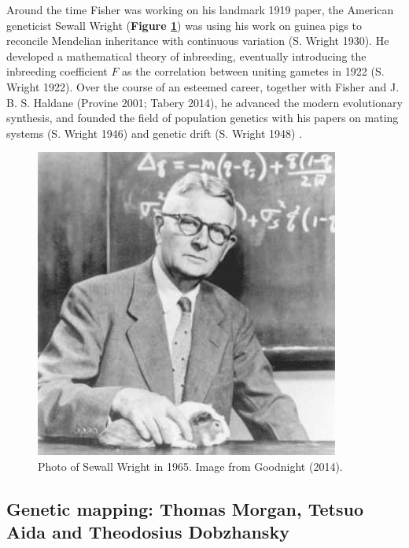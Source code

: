 \documentclass[
]{book}
\begin{document}
Around the time Fisher was working on his landmark 1919 paper, the American geneticist Sewall Wright (\textbf{Figure \ref{fig:wright}}) was using his work on guinea pigs to reconcile Mendelian inheritance with continuous variation (S. Wright 1930). He developed a mathematical theory of inbreeding, eventually introducing the inbreeding coefficient \(F\) as the correlation between uniting gametes in 1922 (S. Wright 1922). Over the course of an esteemed career, together with Fisher and J. B. S. Haldane (Provine 2001; Tabery 2014), he advanced the modern evolutionary synthesis, and founded the field of population genetics with his papers on mating systems (S. Wright 1946) and genetic drift (S. Wright 1948) .



\begin{figure}

\hfill{}\includegraphics[width=1\linewidth]{figs/introduction/Sewall_Wright} 

\caption{Photo of Sewall Wright in 1965. Image from Goodnight (2014).}\label{fig:wright}
\end{figure}

\hypertarget{genetic-mapping-thomas-morgan-tetsuo-aida-and-theodosius-dobzhansky}{%
\subsection{Genetic mapping: Thomas Morgan, Tetsuo Aida and Theodosius Dobzhansky}\label{genetic-mapping-thomas-morgan-tetsuo-aida-and-theodosius-dobzhansky}}
\end{document}
